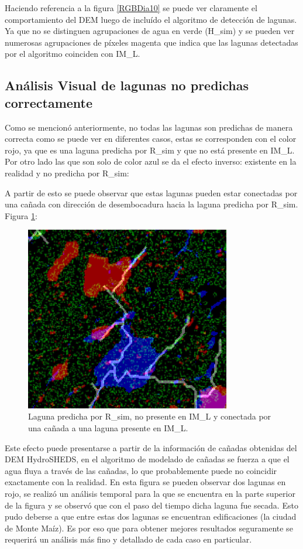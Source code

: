 \documentclass[10pt,a4paper, twoside]{report}
\begin{document}
Haciendo referencia a la figura \ref{RGBDia10} se puede ver claramente el comportamiento del DEM luego de incluído el algoritmo de detección de lagunas. Ya que no se distinguen agrupaciones de agua en verde (H\_sim) y se pueden ver numerosas agrupaciones de píxeles magenta que indica que las lagunas detectadas por el algoritmo coinciden con IM\_L.

\subsection{Análisis Visual de lagunas no predichas correctamente}
\label{obscorreccionlagunas}
Como se mencionó anteriormente, no todas las lagunas son predichas de manera correcta como se puede ver en diferentes casos, estas se corresponden con el color rojo, ya que es una laguna predicha por R\_sim y que no está presente en IM\_L. Por otro lado las que son solo de color azul se da el efecto inverso: existente en la realidad y no predicha por R\_sim:

A partir de esto se puede observar que estas lagunas pueden estar conectadas por una cañada con dirección de desembocadura hacia la laguna predicha por R\_sim. Figura \ref{LagunaProblema1}: 

\begin{figure}[!htb]
   \centering      
   \includegraphics[width=0.8\textwidth]{imagenes/LagunaProblema1.jpg}
 \caption{Laguna predicha por R\_sim, no presente en IM\_L y conectada por una cañada a una laguna presente en IM\_L.}
 \label{LagunaProblema1}
\end{figure}

Este efecto puede presentarse a partir de la información de cañadas obtenidas del DEM HydroSHEDS, en el algoritmo de modelado de cañadas se fuerza a que el agua fluya a través de las cañadas, lo que probablemente puede no coincidir exactamente con la realidad. En esta figura se pueden observar dos lagunas en rojo, se realizó un análisis temporal para la que se encuentra en la parte superior de la figura y se observó que con el paso del tiempo dicha laguna fue secada. Esto pudo deberse a que entre estas dos lagunas se encuentran edificaciones (la ciudad de Monte Maíz). Es por eso que para obtener mejores resultados seguramente se requerirá un análisis más fino y detallado de cada caso en particular.
\end{document}
